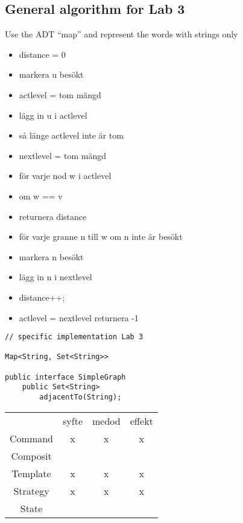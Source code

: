 \documentclass[11pt]{amsart}
\begin{document}
\subsection{General algorithm for Lab 3}
Use the ADT ``map'' and represent the words with strings only
\begin{itemize}
  \item distance = 0
  \item markera u besökt
  \item actlevel = tom mängd
  \item lägg in u i actlevel
  \item så länge actlevel inte är tom
  \item nextlevel = tom mängd
  \item för varje nod w i actlevel
  \item om w == v
  \item returnera distance
  \item för varje granne n till w om n inte är besökt
  \item markera n besökt
  \item lägg in n i nextlevel
  \item distance++;
  \item actlevel = nextlevel returnera -1
\end{itemize} 



\begin{lstlisting}
// specific implementation Lab 3

Map<String, Set<String>>

public interface SimpleGraph
	public Set<String>
		adjacentTo(String);

\end{lstlisting}



\begin{tabular}{| c | c | c | c |}
 & syfte & medod & effekt \\
 Command & x & x & x \\
 Composit &  & & \\
 Template & x & x & x \\
 Strategy & x & x & x \\
 State & & & \\
\end{tabular}
\end{document}

